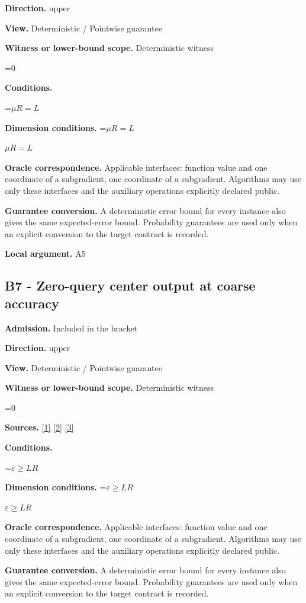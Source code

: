 \documentclass[10pt,a4paper]{article}
\newcommand{\AtlasMath}[1]{\par\begingroup\centering\setbox0=\hbox{$\displaystyle #1$}\ifdim\wd0>1.4\linewidth\typeout{ATLAS WIDE FORMULA: \the\wd0}\fi\ifdim\wd0>\linewidth\resizebox{\linewidth}{!}{\box0}\else\box0\fi\par\endgroup}
\newcommand{\AtlasInlineMath}[1]{\begingroup\setbox0=\hbox{$#1$}\ifdim\wd0>.4\linewidth\endgroup\AtlasMath{#1}\else\endgroup$#1$\fi}
\begin{document}
\textbf{Direction.} upper

\textbf{View.} Deterministic / Pointwise guarantee

\textbf{Witness or lower-bound scope.} Deterministic witness

\AtlasMath{0}
\textbf{Conditions.} 
\AtlasMath{\mu R=L}


\textbf{Dimension conditions.} \AtlasInlineMath{\mu R=L}

\textbf{Oracle correspondence.} Applicable interfaces: function value and one coordinate of a subgradient, one coordinate of a subgradient. Algorithms may use only these interfaces and the auxiliary operations explicitly declared public.

\textbf{Guarantee conversion.} A deterministic error bound for every instance also gives the same expected-error bound. Probability guarantees are used only when an explicit conversion to the target contract is recorded.

\textbf{Local argument.} A5

\subsection{B7 - Zero-query center output at coarse accuracy}
\textbf{Admission.} Included in the bracket

\textbf{Direction.} upper

\textbf{View.} Deterministic / Pointwise guarantee

\textbf{Witness or lower-bound scope.} Deterministic witness

\AtlasMath{0}
\textbf{Sources.} \href{https://arxiv.org/pdf/1405.4980}{[1]} \href{https://www2.isye.gatech.edu/~nemirovs/MOR_AccuracyCertificates.pdf}{[2]} \href{https://arxiv.org/pdf/2609.20701}{[3]}

\textbf{Conditions.} 
\AtlasMath{\varepsilon\ge LR}


\textbf{Dimension conditions.} \AtlasInlineMath{\varepsilon\ge LR}

\textbf{Oracle correspondence.} Applicable interfaces: function value and one coordinate of a subgradient, one coordinate of a subgradient. Algorithms may use only these interfaces and the auxiliary operations explicitly declared public.

\textbf{Guarantee conversion.} A deterministic error bound for every instance also gives the same expected-error bound. Probability guarantees are used only when an explicit conversion to the target contract is recorded.
\end{document}
